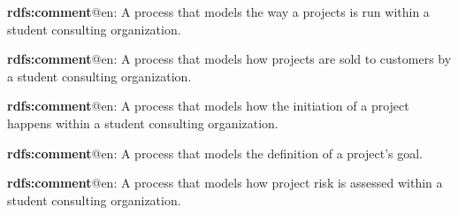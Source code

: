 \documentclass[a4paper, DIV=13, BCOR=0cm]{scrbook}
\begin{document}
\begin{mdframed}[style=onto-1, frametitle={Project Process}]
	{%
		\begin{compactitem}
			\item \textbf{rdfs:comment}@en: A process that models the way a projects is run within a student consulting organization.
		\end{compactitem}
	} %
\end{mdframed}

\begin{mdframed}[style=onto-2, frametitle={Project Sales Process}]
	{%
		\begin{compactitem}
			\item \textbf{rdfs:comment}@en: A process that models how projects are sold to customers by a student consulting organization.
		\end{compactitem}
	} %
\end{mdframed}

\begin{mdframed}[style=onto-2, frametitle={Project Initiation Process}]
	{%
		\begin{compactitem}
			\item \textbf{rdfs:comment}@en: A process that models how the initiation of a project happens within a student consulting organization.
		\end{compactitem}
	} %
\end{mdframed}

\begin{mdframed}[style=onto-3, frametitle={Project Goal Development Process}]
	{%
		\begin{compactitem}
			\item \textbf{rdfs:comment}@en: A process that models the definition of a project's goal.
		\end{compactitem}
	} %
\end{mdframed}

\begin{mdframed}[style=onto-3, frametitle={Project Risk Assessment Process}]
	{%
		\begin{compactitem}
			\item \textbf{rdfs:comment}@en: A process that models how project risk is assessed within a student consulting organization.
		\end{compactitem}
	} %
\end{mdframed}
\end{document}
